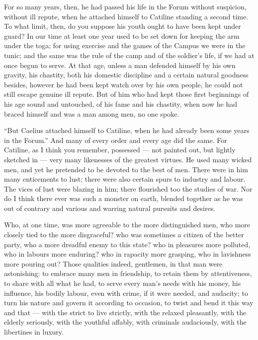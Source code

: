  For so many years, then, he had passed his life in the Forum without suspicion, without ill repute, when he attached himself to Catiline standing a second time. To what limit, then, do you suppose his youth ought to have been kept under guard? In our time at least one year used to be set down for keeping the arm under the toga; for using exercise and the games of the Campus we were in the tunic; and the same was the rule of the camp and of the soldier's life, if we had at once begun to serve. At that age, unless a man defended himself by his own gravity, his chastity, both his domestic discipline and a certain natural goodness besides, however he had been kept watch over by his own people, he could not still escape genuine ill repute. But of him who had kept those first beginnings of his age sound and untouched, of his fame and his chastity, when now he had braced himself and was a man among men, no one spoke.

 ``But Caelius attached himself to Catiline, when he had already been some years in the Forum.'' And many of every order and every age did the same. For Catiline, as I think you remember, possessed --- not painted out, but lightly sketched in --- very many likenesses of the greatest virtues. He used many wicked men, and yet he pretended to be devoted to the best of men. There were in him many enticements to lust; there were also certain spurs to industry and labour. The vices of lust were blazing in him; there flourished too the studies of war. Nor do I think there ever was such a monster on earth, blended together as he was out of contrary and various and warring natural pursuits and desires.

 Who, at one time, was more agreeable to the more distinguished men, who more closely tied to the more disgraceful? who was sometimes a citizen of the better party, who a more dreadful enemy to this state? who in pleasures more polluted, who in labours more enduring? who in rapacity more grasping, who in lavishness more pouring out? Those qualities indeed, gentlemen, in that man were astonishing: to embrace many men in friendship, to retain them by attentiveness, to share with all what he had, to serve every man's needs with his money, his influence, his bodily labour, even with crime, if it were needed, and audacity; to turn his nature and govern it according to occasion, to twist and bend it this way and that --- with the strict to live strictly, with the relaxed pleasantly, with the elderly seriously, with the youthful affably, with criminals audaciously, with the libertines in luxury.

